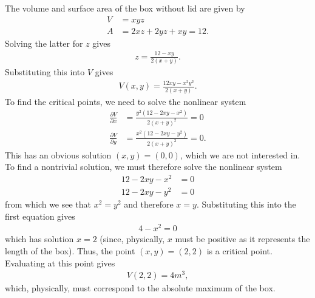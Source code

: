 \documentclass[12pt,letterpaper,reqno]{article}
\numberwithin{equation}{section}
\begin{document}
{{\color{red}
\begin{solution}
	The volume and surface area of the box without lid are given by
	\begin{align*}
		V&=xyz \\
		A&=2xz+2yz+xy=12.
	\end{align*}
	Solving the latter for $z$ gives
	\begin{align*}
		z=\frac{12-xy}{2(x+y)}.
	\end{align*}
	Substituting this into $V$ gives
	\begin{align*}
		V(x,y)=\frac{12xy-x^2y^2}{2(x+y)}.
	\end{align*}
	To find the critical points, we need to solve the nonlinear system
	\begin{align*}
		\frac{\partial V}{\partial x}&=\frac{y^2(12-2xy-x^2)}{2(x+y)^2}=0 \\
		\frac{\partial V}{\partial y}&=\frac{x^2(12-2xy-y^2)}{2(x+y)^2}=0 .
	\end{align*}
	This has an obvious solution $(x,y)=(0,0)$, which we are not interested in. To find a nontrivial solution, we must therefore solve the nonlinear system
	\begin{align*}
		12-2xy-x^2&=0 \\
		12-2xy-y^2&=0
	\end{align*}
	from which we see that $x^2=y^2$ and therefore $x=y$. Substituting this into the first equation gives
	\begin{align*}
		4-x^2=0
	\end{align*}
	which has solution $x=2$ (since, physically, $x$ must be positive as it represents the length of the box). Thus, the point $(x,y)=(2,2)$ is a critical point. Evaluating at this point gives
	\begin{align*}
		V(2,2)=4 m^3,
	\end{align*}
	which, physically, must correspond to the absolute maximum of the box.
\end{solution}}

}
\end{document}
